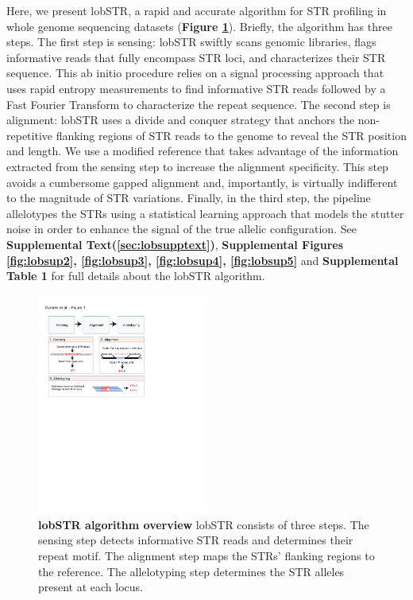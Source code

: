 Here, we present lobSTR, a rapid and accurate algorithm for STR profiling in whole genome sequencing datasets (\textbf{Figure \ref{fig:lobfig1}}). Briefly, the algorithm has three steps. The first step is sensing: lobSTR swiftly scans genomic libraries, flags informative reads that fully encompass STR loci, and characterizes their STR sequence. This ab initio procedure relies on a signal processing approach that uses rapid entropy measurements to find informative STR reads followed by a Fast Fourier Transform to characterize the repeat sequence. The second step is alignment: lobSTR uses a divide and conquer strategy that anchors the non-repetitive flanking regions of STR reads to the genome to reveal the STR position and length. We use a modified reference that takes advantage of the information extracted from the sensing step to increase the alignment specificity. This step avoids a cumbersome gapped alignment and, importantly, is virtually indifferent to the magnitude of STR variations. Finally, in the third step, the pipeline allelotypes the STRs using a statistical learning approach that models the stutter noise in order to enhance the signal of the true allelic configuration. See \textbf{Supplemental Text(\ref{sec:lobsupptext})}, \textbf{Supplemental Figures \ref{fig:lobsup2}, \ref{fig:lobsup3}, \ref{fig:lobsup4}, \ref{fig:lobsup5}} and \textbf{Supplemental Table 1} for full details about the lobSTR algorithm.

\begin{figure}[h!]
\centering
\label{fig:lobfig1}
\includegraphics[width=0.5\textwidth]{Figures/Chapter2/Fig1.pdf}
\caption{\textbf{lobSTR algorithm overview} lobSTR consists of three steps. The sensing step detects informative STR reads and determines their repeat motif. The alignment step maps the STRs' flanking regions to the reference. The allelotyping step determines the STR alleles present at each locus.}
\end{figure}

